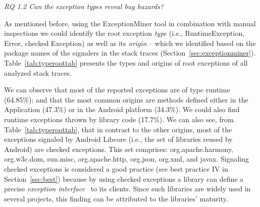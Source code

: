 
\bigskip 


\bigskip 

\noindent\emph{RQ 1.2 Can the exception types reveal bug hazards?}

\bigskip

As mentioned before, using the ExceptionMiner tool in combination with manual inspections we could identify
the root exception \emph{type} (i.e., RuntimeException, Error, checked Exception) as well as its \emph{origin} -- which we 
identified based on the package names of the signalers in the stack traces (Section~\ref{sec:exceptionminer}).
Table~\ref{tab:typeroottab} presents the types and origins of root exceptions of all analyzed stack traces. 

We can observe that most of the reported exceptions are of type runtime 
(64.85\%); and that the most common origins are methods defined either in the Application (47.3\%)
or in the Android platform (34.3\%). We could also find runtime exceptions thrown by library code (17.7\%).
 We can also see, from Table~\ref{tab:typeroottab}, that in contrast to the other origins, most of the 
 exceptions signaled by Android Libcore (i.e., the set of libraries reused by Android) are 
checked exceptions. This set comprises: org.apache.harmony, org.w3c.dom, sun.misc, 
org.apache.http, org.json, org.xml, and javax. Signaling checked exceptions is considered a 
good practice (see best practice IV in Section~\ref{sec:best}) because by using 
checked exceptions a library can define a precise 
\emph{exception interface}~\cite{miller1997issues} to its clients.
 Since such libraries are widely used  in several projects, this
 finding can be attributed to the libraries' maturity.

